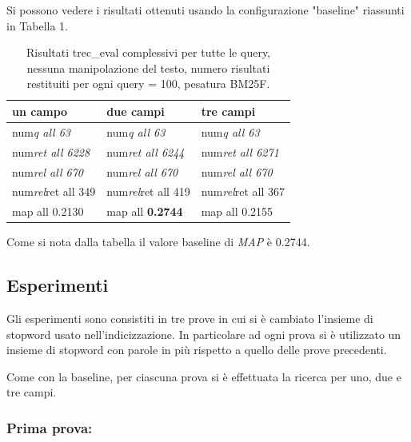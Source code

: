 \documentclass[runningheads]{llncs}
\begin{document}
Si possono vedere i risultati ottenuti usando la configurazione "baseline" riassunti in Tabella 1.
\par


\begin{table}
\vspace{-3mm}
\centering
\begin{tabular}{lll}
\hline
\textbf{ un campo }           & \textbf{ due campi }           & \textbf{ tre campi }            \\ \hline
 num\textit{q all 63 }       &  num\textit{q all 63 }       &  num\textit{q all 63 }        \\
 num\textit{ret all 6228 }  &  num\textit{ret all 6244 }  &  num\textit{ret all 6271 }   \\
 num\textit{rel all 670 }    &  num\textit{rel all 670 }    &  num\textit{rel all 670 }     \\
 num\textit{rel}ret all 349  &  num\textit{rel}ret all 419  &  num\textit{rel}ret all 367   \\
map all 0.2130               & map all \bf 0.2744               & map all 0.2155 \\ \hline
\end{tabular}

\caption{ Risultati trec\_eval complessivi per tutte le query, nessuna manipolazione del testo, numero risultati restituiti per
ogni query = 100, pesatura BM25F.}
\vspace{-7mm}
\end{table}

Come si nota dalla tabella il valore baseline di \textit{MAP} \`e 0.2744.
\par



\vskip 1.5in

\subsection{Esperimenti}

Gli esperimenti sono consistiti in tre prove in cui si \`e cambiato l'insieme di stopword usato nell'indicizzazione. In particolare ad ogni prova si \`e utilizzato un insieme di stopword con parole in pi\`u rispetto a quello delle prove precedenti.

Come con la baseline, per ciascuna prova si \`e effettuata la ricerca per uno, due e tre campi.

\subsubsection{Prima prova:}
\end{document}

